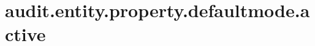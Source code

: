 \section{audit.entity.property.defaultmode.active}
\label{configuration:AuditEntityPropertyDefaultmodeActive}
\AvailableInJavaOnly{\TODO}